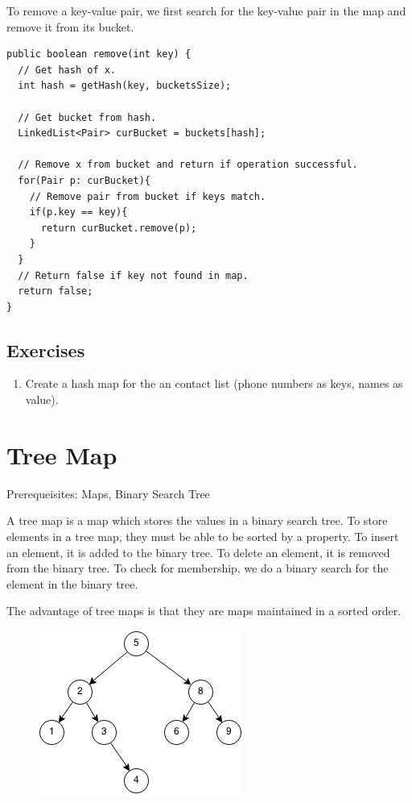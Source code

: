 \documentclass[11pt,oneside]{book}
\makeatletter
\def\maxwidth#1{\ifdim\Gin@nat@width>#1 #1\else\Gin@nat@width\fi}
\makeatother
\begin{document}
To remove a key-value pair, we first search for the key-value pair in the map and remove it from its bucket.

\begin{lstlisting}
public boolean remove(int key) {
  // Get hash of x.
  int hash = getHash(key, bucketsSize);
  
  // Get bucket from hash.
  LinkedList<Pair> curBucket = buckets[hash];
  
  // Remove x from bucket and return if operation successful.
  for(Pair p: curBucket){
    // Remove pair from bucket if keys match.
    if(p.key == key){
      return curBucket.remove(p);
    }
  }
  // Return false if key not found in map.
  return false;
}
\end{lstlisting}

\subsection{Exercises}

\begin{enumerate}
\item Create a hash map for the an contact list (phone numbers as keys, names as value).
\end{enumerate}

        \section{ Tree Map }
        

Prerequeisites: Maps, Binary Search Tree

A tree map is a map which stores the values in a binary search tree. To store elements in a tree map, they must be able to be sorted by a property. To insert an element, it is added to the binary tree. To delete an element, it is removed from the binary tree. To check for membership, we do a binary search for the element in the binary tree.

The advantage of tree maps is that they are maps maintained in a sorted order.

\vspace{5px}\begin{figure}[H]\centering
        \includegraphics[width=0.66\maxwidth{\textwidth}]{bst.png}
        \end{figure}
\end{document}
